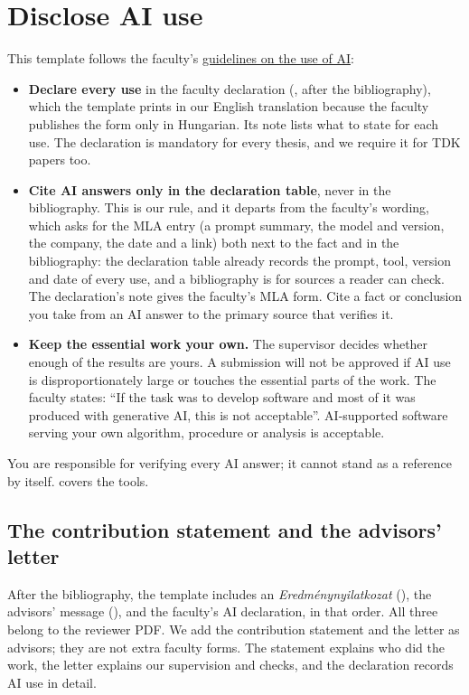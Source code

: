 \section{Disclose AI use}\label{guide:writing:ai}
This template follows the faculty's \href{https://vik.bme.hu/page/1346/}{guidelines on the use of AI}:
\begin{itemize}
  \item \textbf{Declare every use} in the faculty declaration (, after the bibliography), which the template prints in our English translation because the faculty publishes the form only in Hungarian. Its note lists what to state for each use. The declaration is mandatory for every thesis, and we require it for TDK papers too.
  \item \textbf{Cite AI answers only in the declaration table}, never in the bibliography. This is our rule, and it departs from the faculty's wording, which asks for the MLA entry (a prompt summary, the model and version, the company, the date and a link) both next to the fact and in the bibliography: the declaration table already records the prompt, tool, version and date of every use, and a bibliography is for sources a reader can check. The declaration's note gives the faculty's MLA form. Cite a fact or conclusion you take from an AI answer to the primary source that verifies it.
\end{itemize}
\begin{itemize}
  \item \textbf{Keep the essential work your own.} The supervisor decides whether enough of the results are yours. A submission will not be approved if AI use is disproportionately large or touches the essential parts of the work. The faculty states: \enquote{If the task was to develop software and most of it was produced with generative AI, this is not acceptable}. AI-supported software serving your own algorithm, procedure or analysis is acceptable.
\end{itemize}
You are responsible for verifying every AI answer; it cannot stand as a reference by itself.  covers the tools.

\subsection{The contribution statement and the advisors' letter}\label{guide:writing:ai:contribution}
After the bibliography, the template includes an \emph{Eredménynyilatkozat} (), the advisors' message (), and the faculty's AI declaration, in that order. All three belong to the reviewer PDF. We add the contribution statement and the letter as advisors; they are not extra faculty forms. The statement explains who did the work, the letter explains our supervision and checks, and the declaration records AI use in detail.

